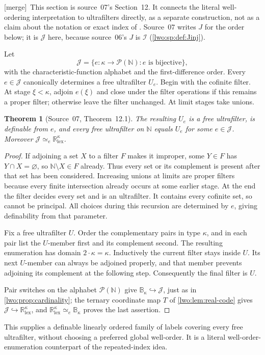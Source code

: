 \documentclass[11pt,a4paper]{article}
\newtheorem{theorem}{Theorem}[section]
\theoremstyle{definition}
\theoremstyle{remark}
\newcommand{\R}{\mathbb R}
\newcommand{\N}{\mathbb N}
\newcommand{\B}{\mathbb B}
\newcommand{\lex}{\mathrm{lex}}
\newcommand{\emb}{\hookrightarrow}
\newcommand{\equi}{\mathrel{\simeq_{\!e}}}
\newcommand{\Jinj}{\mathcal I}
\newcommand{\JU}{\mathcal J}
\newcommand{\merge}{\textsf{[merge]}}
\begin{document}
\merge\ This section is source~07's Section~12. It connects the literal
well-ordering interpretation to ultrafilters directly, as a separate
construction, not as a claim about the notation or exact index of
\cite{KS}. Source~07 writes $J$ for the order below; it is $\JU$ here, because
source~06's $J$ is $\Jinj$ (\cref{lwo:sp:def:Jinj}).

Let
\[
 \JU=\{e:\kappa\to\mathcal P(\N):e\text{ is bijective}\},
\]
with the characteristic-function alphabet and the first-difference order.
Every $e\in\JU$ canonically determines a free ultrafilter $U_e$. Begin with
the cofinite filter. At stage $\xi<\kappa$, adjoin $e(\xi)$ and close under
the filter operations if this remains a proper filter; otherwise leave the
filter unchanged. At limit stages take unions.

\begin{theorem}[Source~07, Theorem~12.1]\label{lwo:rk:thm:greedyultra}
The resulting $U_e$ is a free ultrafilter, is definable from $e$, and every
free ultrafilter on $\N$ equals $U_e$ for some $e\in\JU$. Moreover
$\JU\equi\R^\kappa_{\lex}$.
\end{theorem}
\begin{proof}
If adjoining a set $X$ to a filter $F$ makes it improper, some $Y\in F$ has
$Y\cap X=\varnothing$, so $\N\setminus X\in F$ already. Thus every set or its
complement is present after that set has been considered. Increasing unions at
limits are proper filters because every finite intersection already occurs at
some earlier stage. At the end the filter decides every set and is an
ultrafilter. It contains every cofinite set, so cannot be principal. All
choices during this recursion are determined by $e$, giving definability from
that parameter.

Fix a free ultrafilter $U$. Order the complementary pairs in type $\kappa$,
and in each pair list the $U$-member first and its complement second. The
resulting enumeration has domain $2\cdot\kappa=\kappa$. Inductively the current
filter stays inside $U$. Its next $U$-member can always be adjoined properly,
and that member prevents adjoining its complement at the following step.
Consequently the final filter is $U$.

Pair switches on the alphabet $\mathcal P(\N)$ give $\B_\kappa\emb\JU$, just
as in \cref{lwo:prop:cardinality}; the ternary coordinate map $T$ of
\cref{lwo:lem:real-code} gives $\JU\emb\R^\kappa_{\lex}$, and
$\R^\kappa_{\lex}\equi\B_\kappa$ proves the last assertion.
\end{proof}
This supplies a definable linearly ordered family of labels covering every
free ultrafilter, without choosing a preferred global well-order. It is a
literal well-order-enumeration counterpart of the repeated-index idea.
\end{document}
